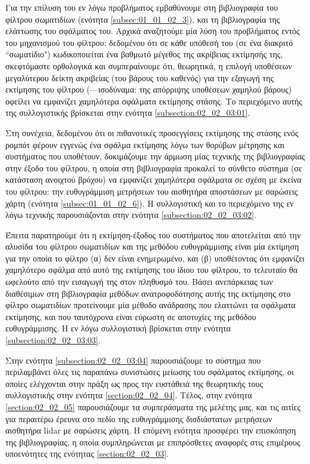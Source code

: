 Για την επίλυση του εν λόγω προβλήματος εμβαθύνουμε στη βιβλιογραφία του
φίλτρου σωματιδίων (ενότητα \ref{subsec:01_01_02_3}), και τη βιβλιογραφία της
ελάττωσης του σφάλματος του. Αρχικά αναζητούμε μία λύση του προβλήματος εντός
του μηχανισμού του φίλτρου: δεδομένου ότι σε κάθε υπόθεσή του (σε ένα διακριτό
``σωματίδιο") κωδικοποιείται ένα βαθμωτό μέγεθος της ακρίβειας εκτίμησής
της, σκεφτόμαστε ορθολογικά και συμπεραίνουμε ότι, θεωρητικά, η επιλογή
υποθέσεων μεγαλύτερου δείκτη ακριβείας (του βάρους του καθενός) για την εξαγωγή
της εκτίμησης του φίλτρου (---ισοδύναμα: της απόρριψης υποθέσεων χαμηλού βάρους)
οφείλει να εμφανίζει χαμηλότερα σφάλματα εκτίμησης στάσης. Το περιεχόμενο αυτής
της συλλογιστικής βρίσκεται στην ενότητα \ref{subsection:02_02_03:01}.

Στη συνέχεια, δεδομένου ότι οι πιθανοτικές προσεγγίσεις εκτίμησης της στάσης
ενός ρομπότ φέρουν εγγενώς ένα σφάλμα εκτίμησης λόγω των θορύβων μέτρησης και
συστήματος που υποθέτουν, δοκιμάζουμε την άρμωση μίας τεχνικής της
βιβλιογραφίας στην έξοδο του φίλτρου, η οποία στη βιβλιογραφία προκαλεί το
σύνθετο σύστημα (σε κατάσταση ανοιχτού βρόχου) να εμφανίζει χαμηλότερα
σφάλματα σε σχέση με εκείνα του φίλτρου: την ευθυγράμμιση μετρήσεων του
αισθητήρα αποστάσεων με σαρώσεις χάρτη (ενότητα \ref{subsec:01_01_02_6}). Η
συλλογιστική και το περιεχόμενο της εν λόγω τεχνικής παρουσιάζονται στην
ενότητα \ref{subsection:02_02_03:02}.

Έπειτα παρατηρούμε ότι η εκτίμηση-έξοδος του συστήματος που αποτελείται από την
αλυσίδα του φίλτρου σωματιδίων και της μεθόδου ευθυγράμμισης είναι μία εκτίμηση
για την οποία το φίλτρο (α) δεν είναι ενημερωμένο, και (β) υποθέτοντας ότι
εμφανίζει χαμηλότερο σφάλμα από αυτό της εκτίμησης του ίδιου του φίλτρου, το
τελευταίο θα ωφελούτο από την εισαγωγή της στον πληθυσμό του. Βάσει ανεπάρκειας
των διαθέσιμων στη βιβλιογραφία μεθόδων ανατροφοδότησης αυτής της εκτίμησης στο
φίλτρο σωματιδίων προτείνουμε μία μέθοδο ανάδρασης που ελαττώνει τα σφάλματα
εκτίμησης, και που ταυτόχρονα είναι εύρωστη σε αποτυχίες της μεθόδου
ευθυγράμμισης.  Η εν λόγω συλλογιστική βρίσκεται στην ενότητα
\ref{subsection:02_02_03:03}.

Στην ενότητα \ref{subsection:02_02_03:04} παρουσιάζουμε το σύστημα που
περιλαμβάνει όλες τις παραπάνω συνιστώσες μείωσης του σφάλματος εκτίμησης, οι
οποίες ελέγχονται στην πράξη ως προς την ευστάθειά της θεωρητικής τους
συλλογιστικής στην ενότητα \ref{section:02_02_04}. Τέλος, στην ενότητα
\ref{section:02_02_05} παρουσιάζουμε τα συμπεράσματα της μελέτης μας, και τις
αιτίες για περαιτέρω έρευνα στο πεδίο της ευθυγράμμισης δισδιάστατων μετρήσεων
αισθητήρα lidar με σαρώσεις χάρτη. Η επόμενη ενότητα προσφέρει την επισκόπηση
της βιβλιογραφίας, η οποία συμπληρώνεται με επιπρόσθετες αναφορές στις
επιμέρους υποενότητες της ενότητας \ref{section:02_02_03}.
